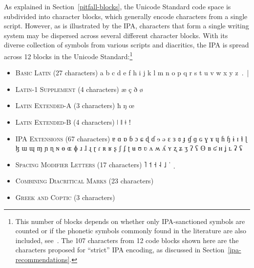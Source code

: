 As explained in Section~\ref{pitfall-blocks}, the Unicode Standard code space is
subdivided into character blocks, which generally encode characters from a
single script. However, as is illustrated by the IPA, characters that form a
single writing system may be dispersed across several different character
blocks. With its diverse collection of symbols from various scripts and
diacritics, the IPA is spread across 12 blocks in the Unicode
Standard:\footnote{This number of blocks depends on whether only IPA-sanctioned
symbols are counted or if the phonetic symbols commonly found in the literature
are also included, see~\cite[Appendix~C]{Moran2012}. The 107 characters from 12 
code blocks shown here are the characters proposed for ``strict'' IPA encoding, 
as discussed in Section~\ref{ipa-recommendations}.}

\begin{itemize}[itemsep=4pt]
	\item \textsc{Basic Latin }(27 characters) \newline 
	a b c d e f h i j k l m n o p q r s t u v w x y z~.~|
	\item \textsc{Latin-1 Supplement} (4 characters) \newline 
	æ ç ð ø
	\item \textsc{Latin Extended-A} (3 characters) \newline 
	ħ ŋ œ
	\item \textsc{Latin Extended-B} (4 characters) \newline 
	ǀ ǁ ǂ ǃ
	\item \textsc{IPA Extensions} (67 characters) \newline 
	ɐ ɑ ɒ ɓ ɔ ɕ ɖ ɗ ɘ ə ɛ ɜ ɞ ɟ ɠ ɡ ɢ ɣ ɤ ɥ ɦ ɧ ɨ ɪ ɬ ɭ ɮ ɯ ɰ ɱ ɲ ɳ ɴ \newline
	ɵ ɶ ɸ ɹ ɺ ɻ ɽ ɾ ʀ ʁ ʂ ʃ ʄ ʈ ʉ ʊ ʋ ʌ ʍ ʎ ʏ ʐ ʑ ʒ ʔ ʕ ʘ ʙ ʛ ʜ ʝ ʟ ʡ ʢ 
	\item \textsc{Spacing Modifier Letters} (17 characters) \newline
	      
	    ˥ ˦ ˧ ˨ ˩ {\large ˈ ˌ}
	\item \textsc{Combining Diacritical Marks} (23 characters) \newline 
	       
	       
	       
	  
	\item \textsc{Greek and Coptic} (3 characters) \newline 

\end{itemize}
